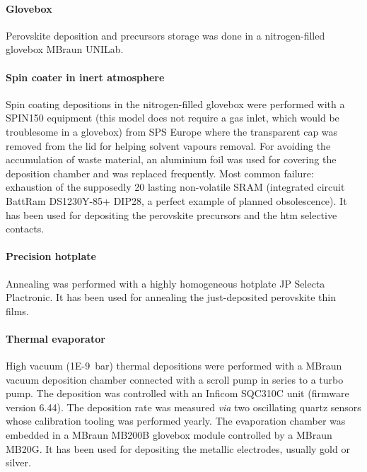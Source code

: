 		\paragraph{Glovebox}
		Perovskite deposition and precursors storage was done in a nitrogen-filled glovebox MBraun UNILab.

		\paragraph{Spin coater in inert atmosphere}
		Spin coating depositions in the nitrogen-filled glovebox were performed with a SPIN150 equipment (this model does not require a gas inlet, which would be troublesome in a glovebox) from SPS Europe where the transparent cap was removed from the lid for helping solvent vapours removal.
		For avoiding the accumulation of waste material, an aluminium foil was used for covering the deposition chamber and was replaced frequently.
		Most common failure: exhaustion of the supposedly \SI{20}{\year} lasting non-volatile SRAM (integrated circuit BattRam DS1230Y-85+ DIP28, a perfect example of planned obsolescence).
		It has been used for depositing the perovskite precursors and the \gls{htm} selective contacts.

		\paragraph{Precision hotplate}
		Annealing was performed with a highly homogeneous hotplate JP Selecta Plactronic.
		It has been used for annealing the just-deposited perovskite thin films.

		\paragraph{Thermal evaporator}
		High vacuum (\SI{1E-9}{\bar}) thermal depositions were performed with a MBraun vacuum deposition chamber connected with a scroll pump in series to a turbo pump.
		The deposition was controlled with an Inficom SQC310C unit (firmware version 6.44).
		The deposition rate was measured \textsl{via} two oscillating quartz sensors whose calibration tooling was performed yearly.
		The evaporation chamber was embedded in a MBraun MB200B glovebox module controlled by a MBraun MB20G.
		It has been used for depositing the metallic electrodes, usually gold or silver.

